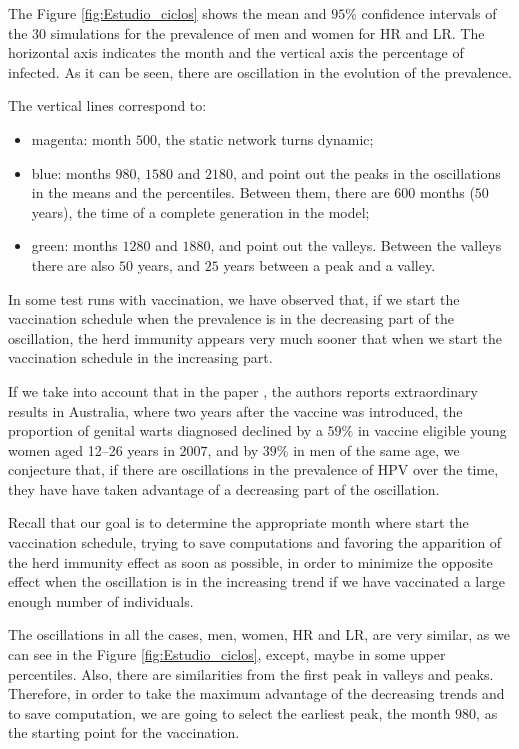 The Figure \ref{fig:Estudio_ciclos} shows the mean and $95\%$ confidence intervals of the $30$ simulations for the prevalence of men and women for HR and LR. The horizontal axis indicates the month and the vertical axis the percentage of infected. As it can be seen, there are oscillation in the evolution of the prevalence.

The vertical lines correspond to:
\begin{itemize}
	\item magenta: month $500$, the static network turns dynamic;
	\item blue: months $980$, $1580$ and $2180$, and point out the peaks in the oscillations in the means and the percentiles. Between them, there are $600$ months ($50$ years), the time of a complete generation in the model;
	\item green: months $1280$  and $1880$, and point out the valleys. Between the valleys there are also $50$ years, and $25$ years between a peak and a valley. 	
\end{itemize}

In some test runs with vaccination, we have observed that, if we start the vaccination schedule when the prevalence is in the decreasing part of the oscillation, the herd immunity appears very much sooner that when we start the vaccination schedule in the increasing part.

If we take into account that in the paper \cite{ali2013genital}, the authors reports extraordinary results in Australia, where two years after the vaccine was introduced, the proportion of genital warts diagnosed declined by a $59\%$ in vaccine eligible young women aged 12--26 years in $2007$, and by $39\%$ in men of the same age, we conjecture that, if there are oscillations in the prevalence of HPV over the time, they have have taken advantage of a decreasing part of the oscillation.

Recall that our goal is to determine the appropriate month where start the vaccination schedule, trying to save computations and favoring the apparition of the herd immunity effect as soon as possible, in order to minimize the opposite effect when the oscillation is in the increasing trend if we have vaccinated a large enough number of individuals.

The oscillations in all the cases, men, women, HR and LR, are very similar, as we can see in the Figure \ref{fig:Estudio_ciclos}, except, maybe in some upper percentiles. Also, there are similarities from the first peak in valleys and peaks. Therefore, in order to take the maximum advantage of the decreasing trends and to save computation, we are going to select the earliest peak, the month $980$, as the starting point for the vaccination.

